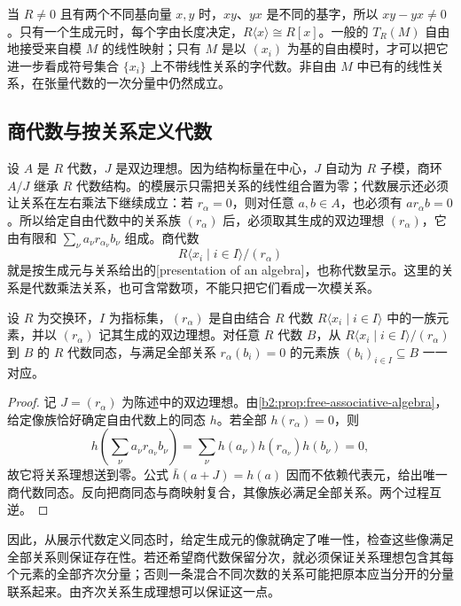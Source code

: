 当 \(R\ne0\) 且有两个不同基向量 \(x,y\) 时，\(xy\)、\(yx\) 是不同的基字，所以 \(xy-yx\ne0\)。只有一个生成元时，每个字由长度决定，\(R\langle x\rangle\cong R[x]\)。一般的 \(T_R(M)\) 自由地接受来自模 \(M\) 的线性映射；只有 \(M\) 是以 \((x_i)\) 为基的自由模时，才可以把它进一步看成符号集合 \(\{x_i\}\) 上不带线性关系的字代数。非自由 \(M\) 中已有的线性关系，在张量代数的一次分量中仍然成立。

\subsection{商代数与按关系定义代数}
\label{b2:subsec:0802:03}

设 \(A\) 是 \(R\) 代数，\(J\) 是双边理想。因为结构标量在中心，\(J\) 自动为 \(R\) 子模，商环 \(A/J\) 继承 \(R\) 代数结构。的模展示只需把关系的线性组合置为零；代数展示还必须让关系在左右乘法下继续成立：若 \(r_\alpha=0\)，则对任意 \(a,b\in A\)，也必须有 \(ar_\alpha b=0\)。所以给定自由代数中的关系族 \((r_\alpha)\) 后，必须取其生成的双边理想 \((r_\alpha)\)，它由有限和 \(\sum_\nu a_\nu r_{\alpha_\nu}b_\nu\) 组成。商代数
\[
	R\langle x_i\mid i\in I\rangle/(r_\alpha)
\]
就是按生成元与关系给出的[presentation of an algebra]，也称代数呈示。这里的关系是代数乘法关系，也可含常数项，不能只把它们看成一次模关系。

\begin{proposition}\label{b2:prop:algebra-relations-universal}
	设 \(R\) 为交换环，\(I\) 为指标集，\((r_\alpha)\) 是自由结合 \(R\) 代数 \(R\langle x_i\mid i\in I\rangle\) 中的一族元素，并以 \((r_\alpha)\) 记其生成的双边理想。对任意 \(R\) 代数 \(B\)，从 \(R\langle x_i\mid i\in I\rangle/(r_\alpha)\) 到 \(B\) 的 \(R\) 代数同态，与满足全部关系 \(r_\alpha(b_i)=0\) 的元素族 \((b_i)_{i\in I}\subseteq B\) 一一对应。
\end{proposition}
\begin{proof}
	记 \(J=(r_\alpha)\) 为陈述中的双边理想。由\cref{b2:prop:free-associative-algebra}，给定像族恰好确定自由代数上的同态 \(h\)。若全部 \(h(r_\alpha)=0\)，则
	\[
		h\left(\sum_\nu a_\nu r_{\alpha_\nu}b_\nu\right) =\sum_\nu h(a_\nu)h(r_{\alpha_\nu})h(b_\nu)=0,
	\]
	故它将关系理想送到零。公式 \(\bar h(a+J)=h(a)\) 因而不依赖代表元，给出唯一商代数同态。反向把商同态与商映射复合，其像族必满足全部关系。两个过程互逆。
\end{proof}

因此，从展示代数定义同态时，给定生成元的像就确定了唯一性，检查这些像满足全部关系则保证存在性。若还希望商代数保留分次，就必须保证关系理想包含其每个元素的全部齐次分量；否则一条混合不同次数的关系可能把原本应当分开的分量联系起来。由齐次关系生成理想可以保证这一点。

